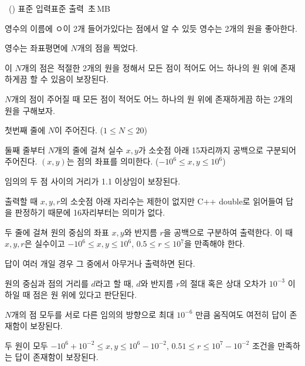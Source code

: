 \begin{problem}{\kcpcproboo\ (\kcpcprobooshort)}
    {표준 입력}{표준 출력}
    {\kcpcprobootime\,초}{\kcpcproboomemory\,MB}{}
    
    영수의 이름에 ㅇ이 2개 들어가있다는 점에서 알 수 있듯 영수는 2개의 원을 좋아한다.
    
    영수는 좌표평면에 $N$개의 점을 찍었다.
    
    이 $N$개의 점은 적절한 2개의 원을 정해서 모든 점이 적어도 어느 하나의 원 위에 존재하게끔 할 수 있음이 보장된다.
    
    $N$개의 점이 주어질 때 모든 점이 적어도 어느 하나의 원 위에 존재하게끔 하는 2개의 원을 구해보자.
    
    \InputFile
    첫번째 줄에 $N$이 주어진다. ($1 \le N \le 20$)
    
    둘째 줄부터 $N$개의 줄에 걸쳐 실수 $x, y$가 소숫점 아래 15자리까지 공백으로 구분되어 주어진다. $(x,y)$는 점의 좌표를 의미한다. ($ -10^6 \le x, y \le 10^6$)
    
    임의의 두 점 사이의 거리가 1.1 이상임이 보장된다.
    
    출력할 때 $x, y, r$의 소숫점 아래 자리수는 제한이 없지만 C++ double로 읽어들여 답을 판정하기 때문에 16자리부터는 의미가 없다.
    
    \OutputFile
    두 줄에 걸쳐 원의 중심의 좌표 $x, y$와 반지름 $r$을 공백으로 구분하여 출력한다. 이 때 $x, y, r$은 실수이고 $-10^6 \le x, y \le 10^6$, $ 0.5 \le r \le 10^7$을 만족해야 한다.
    
    답이 여러 개일 경우 그 중에서 아무거나 출력하면 된다.
   
    \Examples
    
    \begin{example}
    \end{example}
    
    \Notes
    원의 중심과 점의 거리를 $d$라고 할 때, $d$와 반지름 $r$의 절대 혹은 상대 오차가 $10^{-3}$ 이하일 때 점은 원 위에 있다고 판단된다.
    
    $N$개의 점 모두를 서로 다른 임의의 방향으로 최대 $10^{-6}$ 만큼 움직여도 여전히 답이 존재함이 보장된다.
    
    두 원이 모두 $-10^6 + 10^{-2} \le x, y \le 10^6-10^{-2}$,  $0.51 \le r \le 10^7-10^{-2}$ 조건을 만족하는 답이 존재함이 보장된다.
    
\end{problem}

